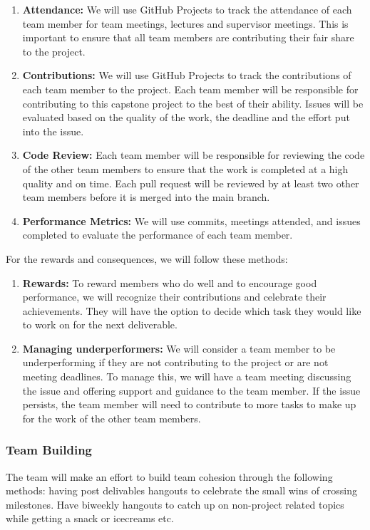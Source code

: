 \documentclass{article}
\begin{document}
\begin{enumerate}
  \item \textbf{Attendance:} We will use GitHub Projects to track the attendance of each team member for team meetings, lectures and supervisor meetings. This is important to ensure that all team members are contributing their fair share to the project.
  \item \textbf{Contributions:} We will use GitHub Projects to track the contributions of each team member to the project. Each team member will be responsible for contributing to this capstone project to the best of their ability. Issues will be evaluated based on the quality of the work, the deadline and the effort put into the issue.
  \item \textbf{Code Review:} Each team member will be responsible for reviewing the code of the other team members to ensure that the work is completed at a high quality and on time. Each pull request will be reviewed by at least two other team members before it is merged into the main branch.
  \item \textbf{Performance Metrics:} We will use commits, meetings attended, and issues completed to evaluate the performance of each team member.
\end{enumerate}

For the rewards and consequences, we will follow these methods:

\begin{enumerate}
  \item \textbf{Rewards:} To reward members who do well and to encourage good performance, we will recognize their contributions and celebrate their achievements. They will have the option to decide which task they would like to work on for the next deliverable.
  \item \textbf{Managing underperformers:} We will consider a team member to be underperforming if they are not contributing to the project or are not meeting deadlines. To manage this, we will have a team meeting discussing the issue and offering support and guidance to the team member. If the issue persists, the team member will need to contribute to more tasks to make up for the work of the other team members.
\end{enumerate}


\subsubsection*{Team Building}
The team will make an effort to build team cohesion through the following methods: having post delivables hangouts to celebrate the small wins of crossing milestones. Have biweekly hangouts to catch up on non-project related topics while getting a snack or icecreams etc.
\end{document}
